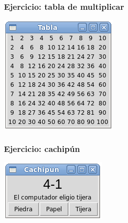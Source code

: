 \documentclass[12pt]{beamer}
\begin{document}
  \begin{frame}
    \label{ejercicio-tabla}
    \frametitle{Ejercicio: tabla de multiplicar}
    \begin{center}
      \includegraphics[width=.6\textwidth]{programas/tkinter/capturas/15.png}
    \end{center}
  \end{frame}

  \begin{frame}
    \label{ejercicio-tabla}
    \frametitle{Ejercicio: cachipún}
    \begin{center}
      \includegraphics[width=.8\textwidth]{programas/tkinter/capturas/16.png}
    \end{center}
  \end{frame}
\end{document}
